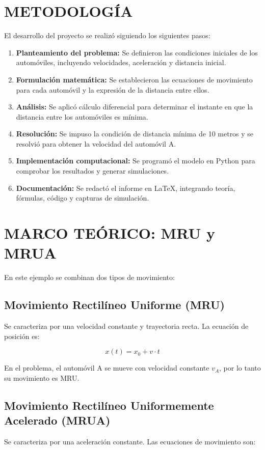 \documentclass[12pt,a4paper]{article}
\begin{document}
\section{METODOLOGÍA}
El desarrollo del proyecto se realizó siguiendo los siguientes pasos:
\begin{enumerate}
    \item \textbf{Planteamiento del problema:} Se definieron las condiciones iniciales de los automóviles, 
    incluyendo velocidades, aceleración y distancia inicial.
    \item \textbf{Formulación matemática:} Se establecieron las ecuaciones de movimiento para cada automóvil 
    y la expresión de la distancia entre ellos.
    \item \textbf{Análisis:} Se aplicó cálculo diferencial para determinar el instante en que la distancia 
    entre los automóviles es mínima.
    \item \textbf{Resolución:} Se impuso la condición de distancia mínima de 10 metros y se resolvió para 
    obtener la velocidad del automóvil A.
    \item \textbf{Implementación computacional:} Se programó el modelo en Python para comprobar los resultados 
    y generar simulaciones.
    \item \textbf{Documentación:} Se redactó el informe en LaTeX, integrando teoría, fórmulas, código y 
    capturas de simulación.
\end{enumerate}


\section{MARCO TEÓRICO: MRU y MRUA}

En este ejemplo se combinan dos tipos de movimiento:

\subsection{Movimiento Rectilíneo Uniforme (MRU)}
Se caracteriza por una velocidad constante y trayectoria recta.  
La ecuación de posición es:


\[
x(t) = x_0 + v \cdot t
\]


En el problema, el automóvil A se mueve con velocidad constante \(v_A\), por lo tanto su movimiento es MRU.

\subsection{Movimiento Rectilíneo Uniformemente Acelerado (MRUA)}
Se caracteriza por una aceleración constante.  
Las ecuaciones de movimiento son:
\end{document}
